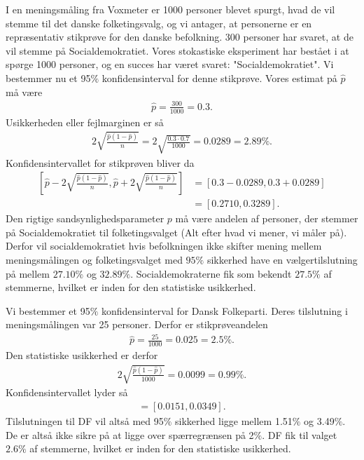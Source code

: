 \begin{exa}
	I en meningsmåling fra Voxmeter er 1000 personer blevet spurgt, hvad de vil stemme til det danske folketingsvalg, og vi antager, at personerne er en repræsentativ stikprøve
	for den danske befolkning. 300 personer har svaret, at de vil stemme på Socialdemokratiet. Vores stokastiske eksperiment har bestået i at spørge 1000 personer, og en succes har været svaret:
	"Socialdemokratiet". Vi bestemmer nu et 95$\%$ konfidensinterval for denne stikprøve.
	Vores estimat på $\hat{p}$ må være
	\begin{align*}
		\hat{p} = \frac{300}{1000} = 0.3.
	\end{align*}
	Usikkerheden eller fejlmarginen er så
	\begin{align*}
		2\sqrt{\frac{\hat{p}(1-\hat{p})}{n}} = 2\sqrt{\frac{0.3\cdot 0.7}{1000}} = 0.0289 = 2.89\%.
	\end{align*}
	Konfidensintervallet for stikprøven bliver da
	\begin{align*}
		\left[\hat{p}-2\sqrt{\frac{\hat{p}(1-\hat{p})}{n}},\hat{p}+2\sqrt{\frac{\hat{p}(1-\hat{p})}{n}}\right] &= [0.3-0.0289,0.3+0.0289] \\
		&=[0.2710,0.3289].
	\end{align*}
	Den rigtige sandsynlighedsparameter $p$ må være andelen af personer, der stemmer på Socialdemokratiet til folketingsvalget (Alt efter hvad vi mener, vi måler på). Derfor
	vil socialdemokratiet hvis befolkningen ikke skifter mening mellem meningsmålingen og folketingsvalget med $95\%$ sikkerhed have en vælgertilslutning på mellem $27.10\%$ og $32.89\%$. 
	Socialdemokraterne fik som bekendt $27.5\%$ af stemmerne, hvilket er inden for den statistiske usikkerhed. 
\end{exa}

\begin{exa}
	Vi bestemmer et 95$\%$ konfidensinterval for Dansk Folkeparti. Deres tilslutning i meningsmålingen var 25 personer. Derfor er stikprøveandelen
	\begin{align*}
		\hat{p} = \frac{25}{1000} = 0.025 = 2.5\%.
	\end{align*}
	Den statistiske usikkerhed er derfor
	\begin{align*}
		2\sqrt{\frac{\hat{p}(1-\hat{p})}{1000}} = 0.0099 = 0.99\%.
	\end{align*}
	Konfidensintervallet lyder så
	\begin{align*}
		[0.025-0.0099,0.025+0.0099] = [0.0151,0.0349].
	\end{align*}
	Tilslutningen til DF vil altså med 95$\%$ sikkerhed ligge mellem 1.51$\%$ og 3.49$\%$. De er altså ikke sikre på at ligge over spærregrænsen på 2$\%$. DF fik til valget $2.6\%$ af stemmerne, hvilket
	er inden for den statistiske usikkerhed.
\end{exa}



